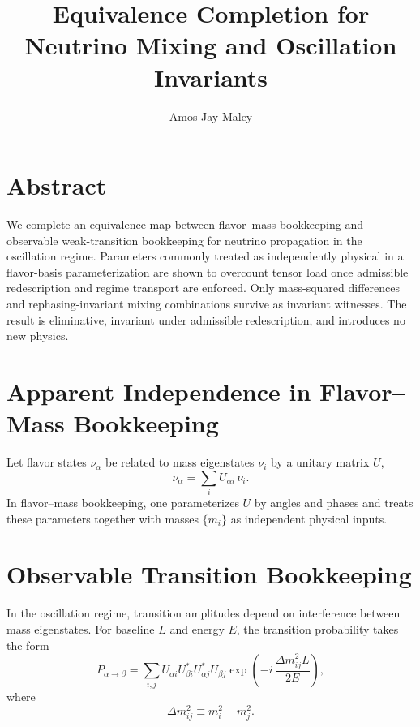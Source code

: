 ﻿\documentclass[11pt]{article}
\title{Equivalence Completion for Neutrino Mixing and Oscillation Invariants}
\author{Amos Jay Maley}
\date{}
\begin{document}
\maketitle

\section*{Abstract}
We complete an equivalence map between flavor--mass bookkeeping and observable weak-transition bookkeeping for neutrino propagation in the oscillation regime. Parameters commonly treated as independently physical in a flavor-basis parameterization are shown to overcount tensor load once admissible redescription and regime transport are enforced. Only mass-squared differences and rephasing-invariant mixing combinations survive as invariant witnesses. The result is eliminative, invariant under admissible redescription, and introduces no new physics.

\section{Apparent Independence in Flavor--Mass Bookkeeping}
Let flavor states $\nu_\alpha$ be related to mass eigenstates $\nu_i$ by a unitary matrix $U$,
\begin{equation}
\nu_\alpha = \sum_i U_{\alpha i}\,\nu_i .
\end{equation}
In flavor--mass bookkeeping, one parameterizes $U$ by angles and phases and treats these parameters together with masses $\{m_i\}$ as independent physical inputs.

\section{Observable Transition Bookkeeping}
In the oscillation regime, transition amplitudes depend on interference between mass eigenstates. For baseline $L$ and energy $E$, the transition probability takes the form
\begin{equation}
P_{\alpha\to\beta}
=\sum_{i,j} U_{\alpha i}U_{\beta i}^*U_{\alpha j}^*U_{\beta j}
\exp\!\left(-i\,\frac{\Delta m_{ij}^2 L}{2E}\right),
\end{equation}
where
\begin{equation}
\Delta m_{ij}^2 \equiv m_i^2 - m_j^2 .
\end{equation}
\end{document}
